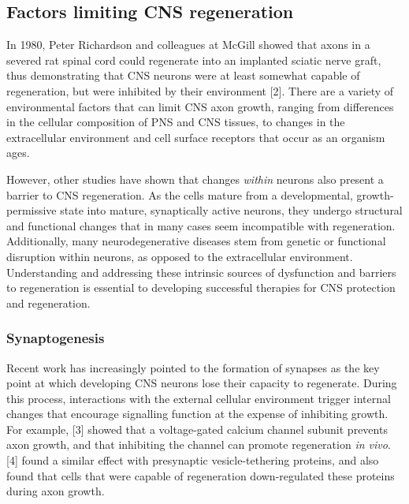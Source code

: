 \documentclass[
  12pt,
  a4paper,
]{article}
\begin{document}
\hypertarget{factors-limiting-cns-regeneration}{%
\subsection{Factors limiting CNS
regeneration}\label{factors-limiting-cns-regeneration}}

In 1980, Peter Richardson and colleagues at McGill showed that axons in
a severed rat spinal cord could regenerate into an implanted sciatic
nerve graft, thus demonstrating that CNS neurons were at least somewhat
capable of regeneration, but were inhibited by their environment
{[}2{]}. There are a variety of environmental factors that can limit CNS
axon growth, ranging from differences in the cellular composition of PNS
and CNS tissues, to changes in the extracellular environment and cell
surface receptors that occur as an organism ages.

However, other studies have shown that changes \emph{within} neurons
also present a barrier to CNS regeneration. As the cells mature from a
developmental, growth-permissive state into mature, synaptically active
neurons, they undergo structural and functional changes that in many
cases seem incompatible with regeneration. Additionally, many
neurodegenerative diseases stem from genetic or functional disruption
within neurons, as opposed to the extracellular environment.
Understanding and addressing these intrinsic sources of dysfunction and
barriers to regeneration is essential to developing successful therapies
for CNS protection and regeneration.

\hypertarget{synaptogenesis}{%
\subsubsection{Synaptogenesis}\label{synaptogenesis}}

Recent work has increasingly pointed to the formation of synapses as the
key point at which developing CNS neurons lose their capacity to
regenerate. During this process, interactions with the external cellular
environment trigger internal changes that encourage signalling function
at the expense of inhibiting growth. For example, {[}3{]} showed that a
voltage-gated calcium channel subunit prevents axon growth, and that
inhibiting the channel can promote regeneration \emph{in vivo}. {[}4{]}
found a similar effect with presynaptic vesicle-tethering proteins, and
also found that cells that were capable of regeneration down-regulated
these proteins during axon growth.
\end{document}
